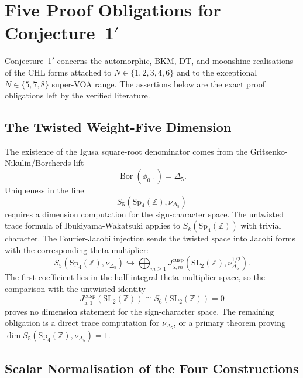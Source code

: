 \providecommand{\kBKM}{\kappa_{\mathrm{BKM}}}
\providecommand{\kch}{\kappa_{\mathrm{ch}}}
\providecommand{\kcat}{\kappa_{\mathrm{cat}}}
\providecommand{\Sp}{\mathrm{Sp}}
\providecommand{\ZZ}{\mathbb{Z}}
\providecommand{\Mtf}{M_{24}}
\providecommand{\CM}{C_{\Mtf}}

\section{Five Proof Obligations for Conjecture~1$'$}
\label{sec:conj1-proof-obligations}

Conjecture~1$'$ concerns the automorphic, BKM, DT, and moonshine
realisations of the CHL forms attached to \(N\in\{1,2,3,4,6\}\) and to
the exceptional \(N\in\{5,7,8\}\) super-VOA range.  The assertions below
are the exact proof obligations left by the verified literature.

\subsection*{The Twisted Weight-Five Dimension}
\label{subsec:twisted-weight-five-dimension}

The existence of the Igusa square-root denominator comes from the
Gritsenko-Nikulin/Borcherds lift
\[
  \operatorname{Bor}(\phi_{0,1})=\Delta_5 .
\]
Uniqueness in the line
\[
  S_5(\Sp_4(\ZZ),\nu_{\Delta_5})
\]
requires a dimension computation for the sign-character space.  The
untwisted trace formula of Ibukiyama-Wakatsuki applies to
\(S_k(\Sp_4(\ZZ))\) with trivial character.  The Fourier-Jacobi
injection sends the twisted space into Jacobi forms with the
corresponding theta multiplier:
\[
  S_5(\Sp_4(\ZZ),\nu_{\Delta_5})
  \hookrightarrow
  \bigoplus_{m\ge 1}
  J^{\mathrm{cusp}}_{5,m}
  (\mathrm{SL}_2(\ZZ),\nu_{\Delta_5}^{1/2}) .
\]
The first coefficient lies in the half-integral theta-multiplier space,
so the comparison with the untwisted identity
\[
  J^{\mathrm{cusp}}_{5,1}(\mathrm{SL}_2(\ZZ))\cong
  S_6(\mathrm{SL}_2(\ZZ))=0
\]
proves no dimension statement for the sign-character space.  The
remaining obligation is a direct trace computation for
\(\nu_{\Delta_5}\), or a primary theorem proving
\(\dim S_5(\Sp_4(\ZZ),\nu_{\Delta_5})=1\).

\subsection*{Scalar Normalisation of the Four Constructions}
\label{subsec:scalar-normalisation}


